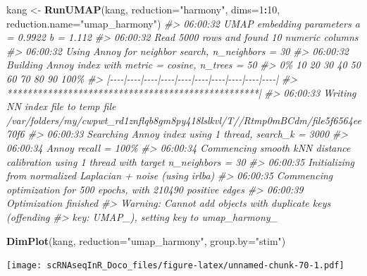 \documentclass[
]{book}
\newenvironment{Shaded}{\begin{snugshade}}{\end{snugshade}}
\newcommand{\AttributeTok}[1]{\textcolor[rgb]{0.13,0.29,0.53}{#1}}
\newcommand{\CommentTok}[1]{\textcolor[rgb]{0.56,0.35,0.01}{\textit{#1}}}
\newcommand{\DecValTok}[1]{\textcolor[rgb]{0.00,0.00,0.81}{#1}}
\newcommand{\FunctionTok}[1]{\textcolor[rgb]{0.13,0.29,0.53}{\textbf{#1}}}
\newcommand{\NormalTok}[1]{#1}
\newcommand{\OtherTok}[1]{\textcolor[rgb]{0.56,0.35,0.01}{#1}}
\newcommand{\SpecialCharTok}[1]{\textcolor[rgb]{0.81,0.36,0.00}{\textbf{#1}}}
\newcommand{\StringTok}[1]{\textcolor[rgb]{0.31,0.60,0.02}{#1}}
\begin{document}
\begin{Shaded}
\begin{Highlighting}[]
\NormalTok{kang }\OtherTok{\textless{}{-}} \FunctionTok{RunUMAP}\NormalTok{(kang, }\AttributeTok{reduction=}\StringTok{"harmony"}\NormalTok{, }\AttributeTok{dims=}\DecValTok{1}\SpecialCharTok{:}\DecValTok{10}\NormalTok{, }\AttributeTok{reduction.name=}\StringTok{"umap\_harmony"}\NormalTok{)}
\CommentTok{\#\textgreater{} 06:00:32 UMAP embedding parameters a = 0.9922 b = 1.112}
\CommentTok{\#\textgreater{} 06:00:32 Read 5000 rows and found 10 numeric columns}
\CommentTok{\#\textgreater{} 06:00:32 Using Annoy for neighbor search, n\_neighbors = 30}
\CommentTok{\#\textgreater{} 06:00:32 Building Annoy index with metric = cosine, n\_trees = 50}
\CommentTok{\#\textgreater{} 0\%   10   20   30   40   50   60   70   80   90   100\%}
\CommentTok{\#\textgreater{} [{-}{-}{-}{-}|{-}{-}{-}{-}|{-}{-}{-}{-}|{-}{-}{-}{-}|{-}{-}{-}{-}|{-}{-}{-}{-}|{-}{-}{-}{-}|{-}{-}{-}{-}|{-}{-}{-}{-}|{-}{-}{-}{-}|}
\CommentTok{\#\textgreater{} **************************************************|}
\CommentTok{\#\textgreater{} 06:00:33 Writing NN index file to temp file /var/folders/my/cwpwt\_rd1znflqb8gm8py418lslkvl/T//Rtmp0mBCdm/file5f6564ee70f6}
\CommentTok{\#\textgreater{} 06:00:33 Searching Annoy index using 1 thread, search\_k = 3000}
\CommentTok{\#\textgreater{} 06:00:34 Annoy recall = 100\%}
\CommentTok{\#\textgreater{} 06:00:34 Commencing smooth kNN distance calibration using 1 thread with target n\_neighbors = 30}
\CommentTok{\#\textgreater{} 06:00:35 Initializing from normalized Laplacian + noise (using irlba)}
\CommentTok{\#\textgreater{} 06:00:35 Commencing optimization for 500 epochs, with 210490 positive edges}
\CommentTok{\#\textgreater{} 06:00:39 Optimization finished}
\CommentTok{\#\textgreater{} Warning: Cannot add objects with duplicate keys (offending}
\CommentTok{\#\textgreater{} key: UMAP\_), setting key to \textquotesingle{}umap\_harmony\_\textquotesingle{}}

\FunctionTok{DimPlot}\NormalTok{(kang, }\AttributeTok{reduction=}\StringTok{"umap\_harmony"}\NormalTok{, }\AttributeTok{group.by=}\StringTok{"stim"}\NormalTok{)}
\end{Highlighting}
\end{Shaded}

\texttt{[image: scRNAseqInR\_Doco\_files/figure-latex/unnamed-chunk-70-1.pdf]}
\end{document}
